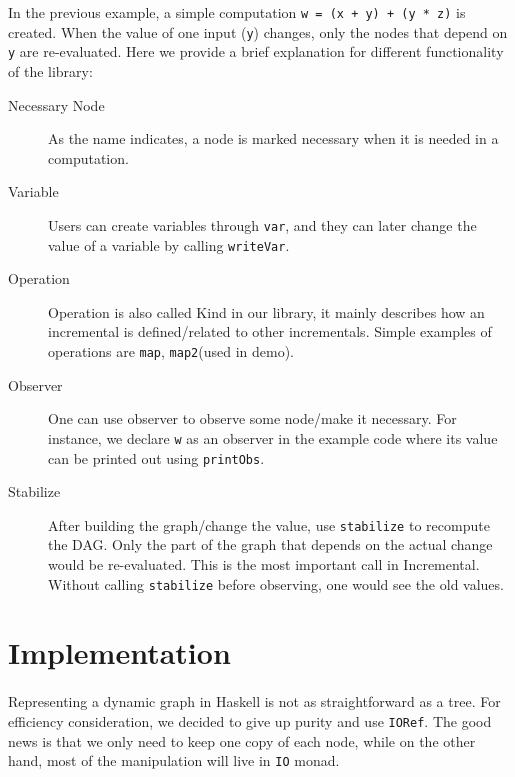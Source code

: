 \documentclass[a4paper, twocolumn]{article}
\newcommand{\code}{\texttt} %
\begin{document}
In the previous example, a simple computation \code{w = (x + y) + (y * z)} is created. When the value of one input (\code{y}) changes, only the nodes that depend on \code{y} are re-evaluated. Here we provide a brief explanation for different functionality of the library:
\begin{description}
  \item [Necessary Node] As the name indicates, a node is marked necessary when it is needed in a computation.
  \item [Variable] Users can create variables through \code{var}, and they can later change the value of a variable by calling \code{writeVar}.
  \item [Operation] Operation is also called Kind in our library, it mainly describes how an incremental is defined/related to other incrementals. Simple examples of operations are \code{map}, \code{map2}(used in demo).
  \item [Observer] One can use observer to observe some node/make it necessary. For instance, we declare \code{w} as an observer in the example code where its value can be printed out using \code{printObs}.
  \item [Stabilize] After building the graph/change the value, use \code{stabilize} to recompute the DAG. Only the part of the graph that depends on the actual change would be re-evaluated. This is the most important call in Incremental. Without calling \code{stabilize} before observing, one would see the old values.
\end{description}

\section{Implementation}
\paragraph{} Representing a dynamic graph in Haskell is not as straightforward as a tree. For efficiency consideration, we decided to give up purity and use \code{IORef}. The good news is that we only need to keep one copy of each node, while on the other hand, most of the manipulation will live in \code{IO} monad.
\end{document}

